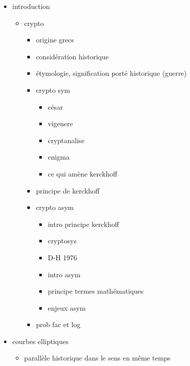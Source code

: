 \begin{itemize}
    \item introduction
        \begin{itemize}
            \item crypto
                \begin{itemize}
                    \item origine grecs
                    \item considération historique
                    \item étymologie, signification porté historique (guerre)
                    \item crypto sym
                        \begin{itemize}
                            \item césar
                            \item vigenere
                            \item cryptanalise
                            \item enigma
                            \item ce qui amène kerckhoff
                        \end{itemize}
                    \item principe de kerckhoff
                    \item crypto asym
                        \begin{itemize}
                            \item intro principe kerckhoff
                            \item cryptosys
                            \item D-H 1976
                            \item intro asym
                            \item principe termes mathématiques
                            \item enjeux asym
                        \end{itemize}
                    \item prob fac et log
                \end{itemize}
        \end{itemize}
    \item courbes elliptiques
        \begin{itemize}
            \item parallèle historique dans le sens en même temps
        \end{itemize}

\end{itemize}
